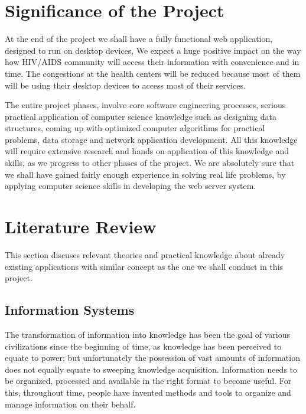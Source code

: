 \documentclass[12pt]{article}
\begin{document}
\section{Significance of the Project}
At the end of the project we shall have a fully functional web application, designed to run on desktop devices, We expect a huge positive impact on the way how HIV/AIDS community will access their information with convenience and in time. The congestions at the health centers will be reduced because most of them will be using their desktop devices to access most of their services. \par

The entire project phases, involve core software engineering processes, serious practical application of computer science knowledge such as designing data structures, coming up with optimized computer algorithms for practical problems, data storage and network application development. All this knowledge will require extensive research and hands on application of this knowledge and skills, as we progress to other phases of the project. We are absolutely sure that we shall have gained fairly enough experience in solving real life problems, by applying computer science skills in developing the web server system.\par

\section{Literature Review}
This section discuses relevant theories and practical knowledge about already existing applications with similar concept as the one we shall conduct in this project. \par

\setlength{\parskip}{3.0pt}
\subsection*{Information Systems}
\setlength{\parskip}{8.04pt}
The transformation of information into knowledge has been the goal of various civilizations since the beginning of time, as knowledge has been perceived to equate to power; but unfortunately the possession of vast amounts of information does not equally equate to sweeping knowledge acquisition. Information needs to be organized, processed and available in the right format to become useful. For this, throughout time, people have invented methods and tools to organize and manage information on their behalf. \par
\end{document}
